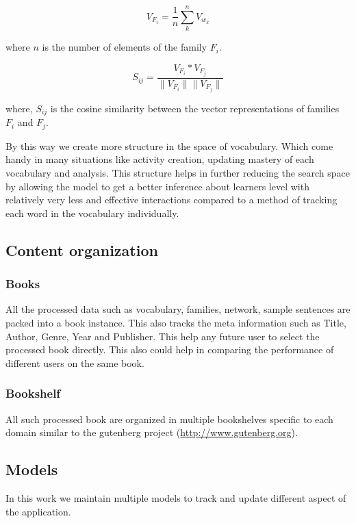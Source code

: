 \documentclass[11pt,a4paper]{article}
\begin{document}
\begin{equation}
  V_{F_i} = \frac{1}{n} \sum_{k}^{n} V_{w_k}
\end{equation}

where ${n}$ is the number of elements of the family ${F_i}$.

\begin{equation}
  S_{ij} = \frac{V_{F_i} * V_{F_j}}{\|V_{F_i}\|  \|V_{F_j}\|}
\end{equation}

where, ${S_{ij}}$ is the cosine similarity between the vector representations of
families ${F_i}$ and ${F_j}$.


By this way we create more structure in the space of vocabulary. Which come
handy in many situations like activity creation, updating mastery of each
vocabulary and analysis. This structure helps in further reducing the search space
by allowing the model to get a better inference about learners level with
relatively very less and effective interactions compared to a method of
tracking each word in the vocabulary individually.

\subsection{Content organization}
\subsubsection{Books}
All the processed data such as vocabulary, families, network, sample sentences
are packed into a book instance. This also tracks the meta information such as
Title, Author, Genre, Year and Publisher. This help any future user to select
the processed book directly. This also could help in comparing the performance
of different users on the same book.

\subsubsection{Bookshelf}
All such processed book are organized in multiple bookshelves specific to each
domain similar to the gutenberg project (\url{http://www.gutenberg.org}).

\subsection{Models}
In this work we maintain multiple models to track and update different aspect
of the application.
\end{document}
